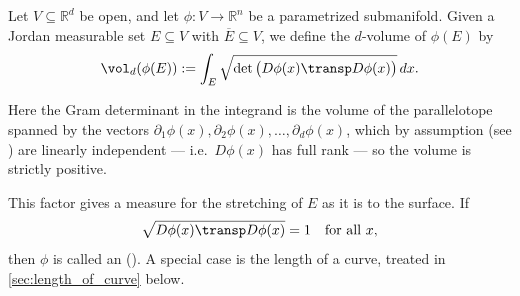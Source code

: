 \begin{definition}
\label{def:d_volume_parametrized_submanifold}
Let $V \subseteq \mathbb{R}^d$ be open, and let $\phi : V \to \mathbb{R}^n$ be a parametrized
submanifold. Given a Jordan measurable set $E \subseteq V$ with $\overline E \subseteq V$,
we define the $d$-volume of $\phi(E)$ by
\[\vol_d(\phi(E)) := \int_E \sqrt{\det\big(D\phi(x)\transp D\phi(x)\big)}\,dx.\]
\end{definition}

Here the Gram determinant in the integrand is the volume of the parallelotope spanned by the
vectors $\partial_1\phi(x),\partial_2\phi(x),\dots,\partial_d\phi(x)$, which by assumption
(see ) are linearly independent --- i.e.\ $D\phi(x)$ has full
rank --- so the volume is strictly positive.

\begin{center}
\end{center}

This factor gives a measure for the stretching of $E$ as it is  to the surface. If
\[\sqrt{D\phi(x)\transp D\phi(x)} = 1 \quad \text{for all } x,\]
then $\phi$ is called an  (). A special case is the
length of a curve, treated in \cref{sec:length_of_curve} below.

